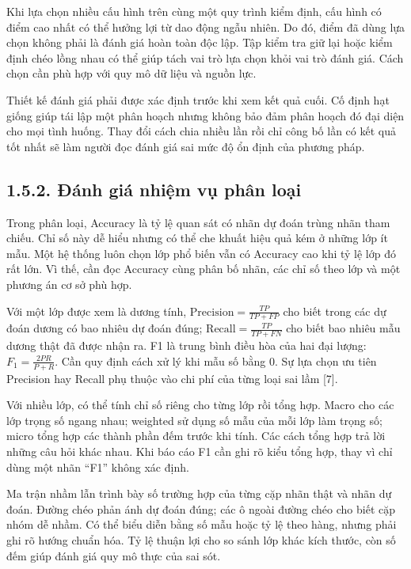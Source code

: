 Khi lựa chọn nhiều cấu hình trên cùng một quy trình kiểm định, cấu hình có điểm cao nhất có thể hưởng lợi từ dao động ngẫu nhiên. Do đó, điểm đã dùng lựa chọn không phải là đánh giá hoàn toàn độc lập. Tập kiểm tra giữ lại hoặc kiểm định chéo lồng nhau có thể giúp tách vai trò lựa chọn khỏi vai trò đánh giá. Cách chọn cần phù hợp với quy mô dữ liệu và nguồn lực.


Thiết kế đánh giá phải được xác định trước khi xem kết quả cuối. Cố định hạt giống giúp tái lập một phân hoạch nhưng không bảo đảm phân hoạch đó đại diện cho mọi tình huống. Thay đổi cách chia nhiều lần rồi chỉ công bố lần có kết quả tốt nhất sẽ làm người đọc đánh giá sai mức độ ổn định của phương pháp.


\subsection{1.5.2. Đánh giá nhiệm vụ phân loại}

Trong phân loại, Accuracy là tỷ lệ quan sát có nhãn dự đoán trùng nhãn tham chiếu. Chỉ số này dễ hiểu nhưng có thể che khuất hiệu quả kém ở những lớp ít mẫu. Một hệ thống luôn chọn lớp phổ biến vẫn có Accuracy cao khi tỷ lệ lớp đó rất lớn. Vì thế, cần đọc Accuracy cùng phân bố nhãn, các chỉ số theo lớp và một phương án cơ sở phù hợp.


Với một lớp được xem là dương tính, \(\mathrm{Precision}=\frac{TP}{TP+FP}\) cho biết trong các dự đoán dương có bao nhiêu dự đoán đúng; \(\mathrm{Recall}=\frac{TP}{TP+FN}\) cho biết bao nhiêu mẫu dương thật đã được nhận ra. F1 là trung bình điều hòa của hai đại lượng: \(F_1=\frac{2PR}{P+R}\). Cần quy định cách xử lý khi mẫu số bằng 0. Sự lựa chọn ưu tiên Precision hay Recall phụ thuộc vào chi phí của từng loại sai lầm [7].


Với nhiều lớp, có thể tính chỉ số riêng cho từng lớp rồi tổng hợp. Macro cho các lớp trọng số ngang nhau; weighted sử dụng số mẫu của mỗi lớp làm trọng số; micro tổng hợp các thành phần đếm trước khi tính. Các cách tổng hợp trả lời những câu hỏi khác nhau. Khi báo cáo F1 cần ghi rõ kiểu tổng hợp, thay vì chỉ dùng một nhãn “F1” không xác định.


Ma trận nhầm lẫn trình bày số trường hợp của từng cặp nhãn thật và nhãn dự đoán. Đường chéo phản ánh dự đoán đúng; các ô ngoài đường chéo cho biết cặp nhóm dễ nhầm. Có thể biểu diễn bằng số mẫu hoặc tỷ lệ theo hàng, nhưng phải ghi rõ hướng chuẩn hóa. Tỷ lệ thuận lợi cho so sánh lớp khác kích thước, còn số đếm giúp đánh giá quy mô thực của sai sót.


